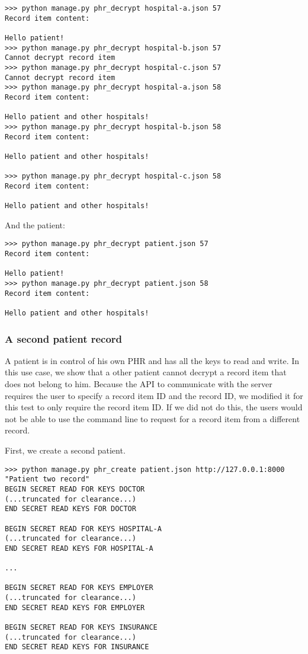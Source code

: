 \documentclass[a4paper]{article}
\begin{document}
			\begin{lstlisting}
>>> python manage.py phr_decrypt hospital-a.json 57
Record item content:

Hello patient!
>>> python manage.py phr_decrypt hospital-b.json 57
Cannot decrypt record item
>>> python manage.py phr_decrypt hospital-c.json 57
Cannot decrypt record item
>>> python manage.py phr_decrypt hospital-a.json 58
Record item content:

Hello patient and other hospitals!
>>> python manage.py phr_decrypt hospital-b.json 58
Record item content:

Hello patient and other hospitals!

>>> python manage.py phr_decrypt hospital-c.json 58
Record item content:

Hello patient and other hospitals!
			\end{lstlisting}

			And the patient:

			\begin{lstlisting}
>>> python manage.py phr_decrypt patient.json 57
Record item content:

Hello patient!
>>> python manage.py phr_decrypt patient.json 58
Record item content:

Hello patient and other hospitals!
			\end{lstlisting}
		
		\subsubsection{A second patient record}\label{sec:usecase_8}
			A patient is in control of his own PHR and has all the keys to read and write. In this use case, we show that a other patient cannot decrypt a record item that does not belong to him. Because the API to communicate with the server requires the user to specify a record item ID and the record ID, we modified it for this test to only require the record item ID. If we did not do this, the users would not be able to use the command line to request for a record item from a different record.
			
			First, we create a second patient.
			
			\begin{lstlisting}
>>> python manage.py phr_create patient.json http://127.0.0.1:8000 "Patient two record"
BEGIN SECRET READ FOR KEYS DOCTOR
(...truncated for clearance...)
END SECRET READ KEYS FOR DOCTOR

BEGIN SECRET READ FOR KEYS HOSPITAL-A
(...truncated for clearance...)
END SECRET READ KEYS FOR HOSPITAL-A

...

BEGIN SECRET READ FOR KEYS EMPLOYER
(...truncated for clearance...)
END SECRET READ KEYS FOR EMPLOYER

BEGIN SECRET READ FOR KEYS INSURANCE
(...truncated for clearance...)
END SECRET READ KEYS FOR INSURANCE
			\end{lstlisting}
			
\end{document}
